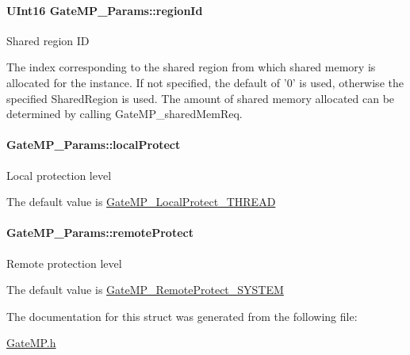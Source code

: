 \paragraph[{regionId}]{\setlength{\rightskip}{0pt plus 5cm}UInt16 {\bf GateMP\_\-Params::regionId}}\hfill\label{struct_gate_m_p___params_a5af9a96f1fcf6f29b69c07207a33d453}
Shared region ID

The index corresponding to the shared region from which shared memory is allocated for the instance. If not specified, the default of '0' is used, otherwise the specified SharedRegion is used. The amount of shared memory allocated can be determined by calling GateMP\_\-sharedMemReq. 
\paragraph[{localProtect}]{ {\bf GateMP\_\-Params::localProtect}}\hfill\label{struct_gate_m_p___params_ac080433fff177b3d5b1cd5dcafc9e28c}
Local protection level

The default value is \hyperlink{_gate_m_p_8h_a3877bd64627d7449d3687e8b06939652a257bc8d4b8d6d19bdbe96cae37cbd908}{GateMP\_\-LocalProtect\_\-THREAD} 
\paragraph[{remoteProtect}]{ {\bf GateMP\_\-Params::remoteProtect}}\hfill\label{struct_gate_m_p___params_a32a1870109d6aa6f583932aff19ebb50}
Remote protection level

The default value is \hyperlink{_gate_m_p_8h_a88716d5706d8fa8c6a3b9a4f023ef1d8aba4e153ee33cce1d32dc84254261c557}{GateMP\_\-RemoteProtect\_\-SYSTEM} 

The documentation for this struct was generated from the following file:\begin{DoxyCompactItemize}
\item 
\hyperlink{_gate_m_p_8h}{GateMP.h}\end{DoxyCompactItemize}
